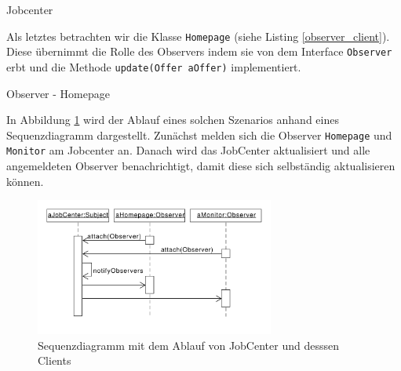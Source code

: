 \begin{listing}[h!]
   \centering
   \caption{Jobcenter}
    \label{observer_jobcenter}
\end{listing} 

Als letztes betrachten wir die Klasse \texttt{Homepage} (siehe Listing \ref{observer_client}). Diese übernimmt die Rolle des Observers indem sie von dem Interface \texttt{Observer} erbt und die Methode \texttt{update(Offer aOffer)} implementiert. 

\begin{listing}[h!]
   \centering
   \caption{Observer - Homepage}
    \label{observer_client}
\end{listing}

In Abbildung \ref{observer_sequenz} wird der Ablauf eines solchen Szenarios anhand eines Sequenzdiagramm dargestellt. Zunächst melden sich die Observer \texttt{Homepage} und \texttt{Monitor} am Jobcenter an. Danach wird das JobCenter aktualisiert und alle angemeldeten Observer benachrichtigt, damit diese sich selbständig aktualisieren können.

\begin{figure}[h!]
\centering
\includegraphics[width=0.7\textwidth]{./paper/observer/observer_sequenz}
\caption{Sequenzdiagramm mit dem Ablauf von JobCenter und desssen Clients}
\label{observer_sequenz}
\end{figure} 
